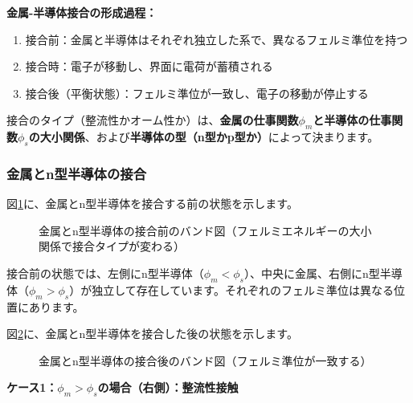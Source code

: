 \textbf{金属-半導体接合の形成過程：}

\begin{enumerate}
\item 接合前：金属と半導体はそれぞれ独立した系で、異なるフェルミ準位を持つ
\item 接合時：電子が移動し、界面に電荷が蓄積される
\item 接合後（平衡状態）：フェルミ準位が一致し、電子の移動が停止する
\end{enumerate}

接合のタイプ（整流性かオーム性か）は、\textbf{金属の仕事関数$\phi_m$と半導体の仕事関数$\phi_s$の大小関係}、および\textbf{半導体の型（n型かp型か）}によって決まります。

\subsubsection{金属とn型半導体の接合}

図\ref{fig:metal_n_before}に、金属とn型半導体を接合する前の状態を示します。

\begin{figure}[H]
\centering
{}
\caption{金属とn型半導体の接合前のバンド図（フェルミエネルギーの大小関係で接合タイプが変わる）}
\label{fig:metal_n_before}
\end{figure}

接合前の状態では、左側にn型半導体（$\phi_m < \phi_s$）、中央に金属、右側にn型半導体（$\phi_m > \phi_s$）が独立して存在しています。それぞれのフェルミ準位は異なる位置にあります。

図\ref{fig:metal_n_after}に、金属とn型半導体を接合した後の状態を示します。

\begin{figure}[H]
\centering
{}
\caption{金属とn型半導体の接合後のバンド図（フェルミ準位が一致する）}
\label{fig:metal_n_after}
\end{figure}

\textbf{ケース1：$\phi_m > \phi_s$の場合（右側）：整流性接触}

